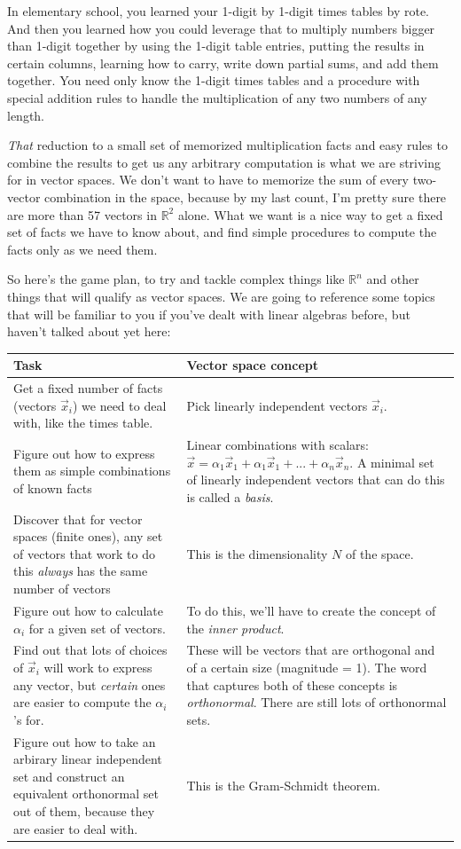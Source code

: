 \documentclass[
]{book}
\begin{document}
In elementary school, you learned your 1-digit by 1-digit times tables by rote. And then you learned how you could leverage that to multiply numbers bigger than 1-digit together by using the 1-digit table entries, putting the results in certain columns, learning how to carry, write down partial sums, and add them together. You need only know the 1-digit times tables and a procedure with special addition rules to handle the multiplication of any two numbers of any length.

\emph{That} reduction to a small set of memorized multiplication facts and easy rules to combine the results to get us any arbitrary computation is what we are striving for in vector spaces. We don't want to have to memorize the sum of every two-vector combination in the space, because by my last count, I'm pretty sure there are more than 57 vectors in \(\mathbb{R}^2\) alone. What we want is a nice way to get a fixed set of facts we have to know about, and find simple procedures to compute the facts only as we need them.

So here's the game plan, to try and tackle complex things like \(\mathbb{R}^n\) and other things that will qualify as vector spaces. We are going to reference some topics that will be familiar to you if you've dealt with linear algebras before, but haven't talked about yet here:

\begin{longtable}[]{@{}
  >{\raggedright\arraybackslash}p{}
  >{\raggedright\arraybackslash}p{}@{}}
\toprule
Task & Vector space concept \\
\midrule
\endhead
Get a fixed number of facts (vectors \(\vec{x}_{i}\)) we need to deal with, like the times table. & Pick linearly independent vectors \(\vec{x}_{i}\). \\
Figure out how to express them as simple combinations of known facts & Linear combinations with scalars: \(\vec{x} = \alpha_{1} \vec{x}_{1} + \alpha_{1} \vec{x}_{1} + ... + \alpha_{n} \vec{x}_{n}\). A minimal set of linearly independent vectors that can do this is called a \emph{basis}. \\
Discover that for vector spaces (finite ones), any set of vectors that work to do this \emph{always} has the same number of vectors & This is the dimensionality \(N\) of the space. \\
Figure out how to calculate \(\alpha_{i}\) for a given set of vectors. & To do this, we'll have to create the concept of the \emph{inner product}. \\
Find out that lots of choices of \(\vec{x}_{i}\) will work to express any vector, but \emph{certain} ones are easier to compute the \(\alpha_{i}\)'s for. & These will be vectors that are orthogonal and of a certain size (magnitude = 1). The word that captures both of these concepts is \emph{orthonormal}. There are still lots of orthonormal sets. \\
Figure out how to take an arbirary linear independent set and construct an equivalent orthonormal set out of them, because they are easier to deal with. & This is the Gram-Schmidt theorem. \\
\bottomrule
\end{longtable}
\end{document}
